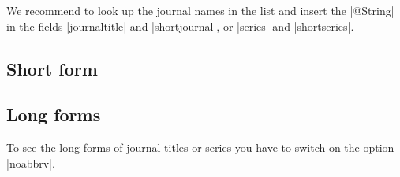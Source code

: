 \documentclass[a4paper,
10pt,
greek,
french,
spanish,
italian,
ngerman,
english
]{ltxdoc}
\begin{document}
We recommend to look up the journal names in the list and insert the |@String| in the fields  |journaltitle| and |shortjournal|, or |series| and |shortseries|.


\subsection{Short form} \label{liste-kurz}
\begin{multicols}{2}

\end{multicols}


\subsection{Long forms}\label{liste-lang}
To see the long forms of journal titles or series you have to switch on the option  |noabbrv|.



\end{document}
